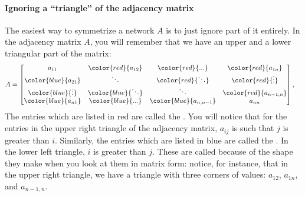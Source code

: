 \documentclass[letterpaper,10pt,english]{jupyterBook}
\begin{document}
\paragraph{Ignoring a “triangle” of the adjacency matrix}
\label{\detokenize{representations/ch4/regularization:ignoring-a-triangle-of-the-adjacency-matrix}}
\sphinxAtStartPar
The easiest way to symmetrize a network \(A\) is to just ignore part of it entirely. In the adjacency matrix \(A\), you will remember that we have an upper and a lower triangular part of the matrix:
\begin{align*}
    A &= \begin{bmatrix}
        a_{11} & \color{red}{a_{12}} & \color{red}{...} & \color{red}{a_{1n}} \\
        \color{blue}{a_{21}} & \ddots & \color{red}{\ddots} & \color{red}{\vdots} \\
        \color{blue}{\vdots} &\color{blue}{\ddots} &\ddots & \color{red}{a_{n-1, n}}\\
        \color{blue}{a_{n1}} & \color{blue}{...} & \color{blue}{a_{n,n-1}} & a_{nn}
    \end{bmatrix},
\end{align*}
\sphinxAtStartPar
The entries which are listed in red are called the . You will notice that for the entries in the upper right triangle of the adjacency matrix, \(a_{ij}\) is such that \(j\) is  greater than \(i\). Similarly, the entries which are listed in blue are called the . In the lower left triangle, \(i\) is  greater than \(j\). These are called  because of the shape they make when you look at them in matrix form: notice, for instance, that in the upper right triangle, we have a triangle with three corners of values: \(a_{12}\), \(a_{1n}\), and \(a_{n-1, n}\).
\end{document}
